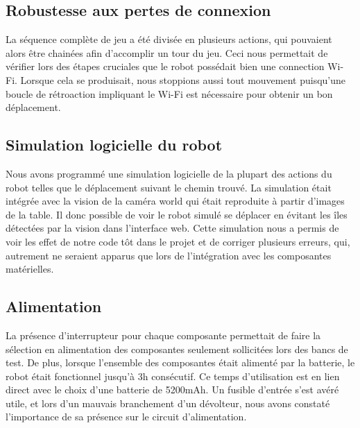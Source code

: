 \subsection{Robustesse aux pertes de connexion}
La séquence complète de jeu a été divisée en plusieurs actions, qui pouvaient alors être chainées afin d'accomplir un tour du jeu. Ceci nous permettait de vérifier lors des étapes cruciales que le robot possédait bien une connection Wi-Fi. Lorsque cela se produisait, nous stoppions aussi tout mouvement puisqu'une boucle de rétroaction impliquant le Wi-Fi est nécessaire pour obtenir un bon déplacement.

\subsection{Simulation logicielle du robot}
Nous avons programmé une simulation logicielle de la plupart des actions du robot telles que le déplacement suivant le chemin trouvé. La simulation était intégrée avec la vision de la caméra world qui était reproduite à partir d’images de la table. Il donc possible de voir le robot simulé se déplacer en évitant les îles détectées par la vision dans l’interface web. Cette simulation nous a permis de voir les effet de notre code tôt dans le projet et de corriger plusieurs erreurs, qui, autrement ne seraient apparus que lors de l’intégration avec les composantes matérielles.

\subsection{Alimentation}
La présence d’interrupteur pour chaque composante permettait de faire la sélection en alimentation des composantes seulement sollicitées lors des bancs de test. De plus, lorsque l’ensemble des composantes était alimenté par la batterie, le robot était fonctionnel jusqu’à 3h consécutif. Ce temps d’utilisation est en lien direct avec le choix d’une batterie de 5200mAh. Un fusible d’entrée s’est avéré utile, et lors d’un mauvais branchement d’un dévolteur, nous avons constaté l’importance de sa présence sur le circuit d’alimentation.